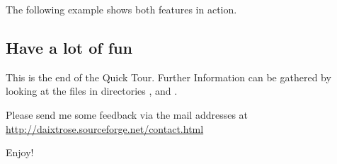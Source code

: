 The following example shows both features in action.
















\subsection{Have a lot of fun}

This is the end of the Quick Tour.
Further Information can be gathered by looking at the files in directories
,  and .

Please send me some feedback via the mail addresses at \url{http://daixtrose.sourceforge.net/contact.html}

Enjoy!



